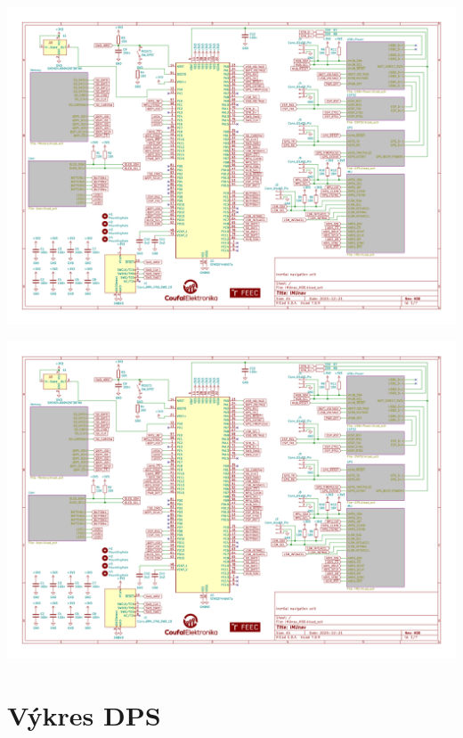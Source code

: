 \includegraphics[angle=90, page=6, width=\textwidth]{KiCad/schematic.pdf}

\includegraphics[angle=90, page=7, width=\textwidth]{KiCad/schematic.pdf}

\chapter{Výkres DPS}
